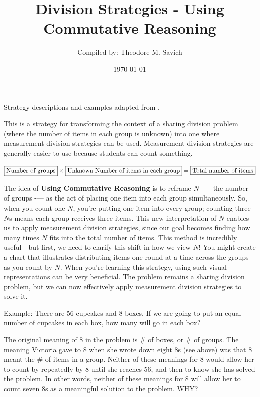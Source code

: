 \documentclass[11pt]{article}
\title{Division Strategies - Using Commutative Reasoning}
\author{Compiled by: Theodore M. Savich}
\date{\today}
\begin{document}
\maketitle

Strategy descriptions and examples adapted from \textcite{HackenbergCourseNotes}.

This is a strategy for transforming the context of a sharing division problem (where the number of items in each group is unknown) into one where measurement division strategies can be used. Measurement division strategies are generally easier to use because students can count something. 

\bigskip

$\fbox{Number of groups} \times \fbox{Unknown Number of items in each group}  = \fbox{Total number of items}$



The idea of \textbf{Using Commutative Reasoning} is to reframe $N$ —- the number of groups -— as the act of placing one item into each group simultaneously. So, when you count one $N$, you're putting one item into every group; counting three $N$s means each group receives three items. This new interpretation of $N$ enables us to apply measurement division strategies, since our goal becomes finding how many times $N$ fits into the total number of items. This method is incredibly useful—but first, we need to clarify this shift in how we view $N$! You might create a chart that illustrates distributing items one round at a time across the groups as you count by $N$. When you're learning this strategy, using such visual representations can be very beneficial. The problem remains a sharing division problem, but we can now effectively apply measurement division strategies to solve it.


\noindent Example: There are 56 cupcakes and 8 boxes. If we are going to put an equal number of cupcakes in each box, how many will go in each box?


The original meaning of 8 in the problem is \# of boxes, or \# of
groups. The meaning Victoria gave to 8 when she wrote down eight 8s (see
above) was that 8 meant the \# of items in a group. Neither of these
meanings for 8 would allow her to count by repeatedly by 8 until she
reaches 56, and then to know she has solved the problem. In other
words, neither of these meanings for 8 will allow her to count seven 8s
as a meaningful solution to the problem. WHY?
\end{document}
